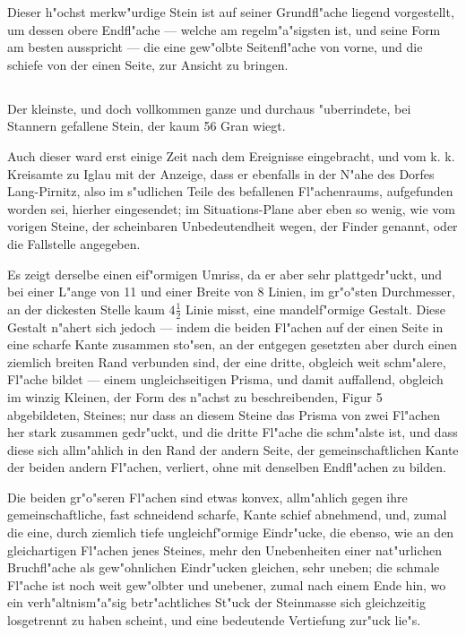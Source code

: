 \documentclass[a4paper, 11pt, oneside, german]{article}
\begin{document}
Dieser h"ochst merkw"urdige Stein ist auf seiner Grundfl"ache liegend vorgestellt, um dessen obere Endfl"ache --- welche am regelm"a"sigsten ist, und seine Form am besten ausspricht --- die eine gew"olbte Seitenfl"ache von vorne, und die schiefe von der einen Seite, zur Ansicht zu bringen.

\subsection{}
\paragraph{}
Der kleinste, und doch vollkommen ganze und durchaus "uberrindete, bei Stannern gefallene Stein, der kaum 56 Gran wiegt.

Auch dieser ward erst einige Zeit nach dem Ereignisse eingebracht, und vom k. k. Kreisamte zu Iglau mit der Anzeige, dass er ebenfalls in der N"ahe des Dorfes Lang-Pirnitz, also im s"udlichen Teile des befallenen Fl"achenraums, aufgefunden worden sei, hierher eingesendet; im Situations-Plane aber eben so wenig, wie vom vorigen Steine, der scheinbaren Unbedeutendheit wegen, der Finder genannt, oder die Fallstelle angegeben.

Es zeigt derselbe einen eif"ormigen Umriss, da er aber sehr plattgedr"uckt, und bei einer L"ange von 11 und einer Breite von 8 Linien, im gr"o"sten Durchmesser, an der dickesten Stelle kaum $4\frac{1}{2}$ Linie misst, eine mandelf"ormige Gestalt. Diese Gestalt n"ahert sich jedoch --- indem die beiden Fl"achen auf der einen Seite in eine scharfe Kante zusammen sto"sen, an der entgegen gesetzten aber durch einen ziemlich breiten Rand verbunden sind, der eine dritte, obgleich weit schm"alere, Fl"ache bildet --- einem ungleichseitigen Prisma, und damit auffallend, obgleich im winzig Kleinen, der Form des n"achst zu beschreibenden, Figur 5 abgebildeten, Steines; nur dass an diesem Steine das Prisma von zwei Fl"achen her stark zusammen gedr"uckt, und die dritte Fl"ache die schm"alste ist, und dass diese sich allm"ahlich in den Rand der andern Seite, der gemeinschaftlichen Kante der beiden andern Fl"achen, verliert, ohne mit denselben Endfl"achen zu bilden.

Die beiden gr"o"seren Fl"achen sind etwas konvex, allm"ahlich gegen ihre gemeinschaftliche, fast schneidend scharfe, Kante schief abnehmend, und, zumal die eine, durch ziemlich tiefe ungleichf"ormige Eindr"ucke, die ebenso, wie an den gleichartigen Fl"achen jenes Steines, mehr den Unebenheiten einer nat"urlichen Bruchfl"ache als gew"ohnlichen Eindr"ucken gleichen, sehr uneben; die schmale Fl"ache ist noch weit gew"olbter und unebener, zumal nach einem Ende hin, wo ein verh"altnism"a"sig betr"achtliches St"uck der Steinmasse sich gleichzeitig losgetrennt zu haben scheint, und eine bedeutende Vertiefung zur"uck lie"s.
\end{document}
